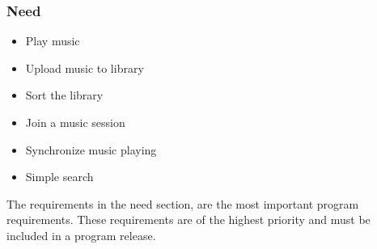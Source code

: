\subsubsection{Need}


\begin{itemize}
	\item Play music
	\item Upload music to library
	\item Sort the library
	\item Join a music session
	\item Synchronize music playing
	\item Simple search
\end{itemize}


The requirements in the need section, are the most important program requirements. These requirements are of the highest priority and must be included in a program release.